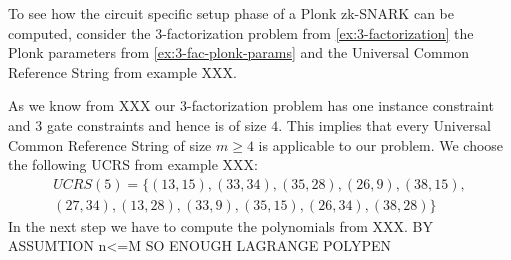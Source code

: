 \begin{example}
\label{ex:3-fac-CSCRS}
To see how the circuit specific setup phase of a Plonk zk-SNARK can be computed, consider the $3$-factorization problem from \ref{ex:3-factorization} the Plonk parameters from \examplename{} \ref{ex:3-fac-plonk-params} and the Universal Common Reference String from example XXX. 

As we know from XXX our $3$-factorization problem has one instance constraint and $3$ gate constraints and hence is of size $4$. This implies that every Universal Common Reference String of size $m\geq 4$ is applicable to our problem. We choose the following UCRS from example XXX:
\begin{multline*}
UCRS(5) =\{(13,15), (33,34), (35,28), (26,9), (38,15), \\
(27,34), (13,28), (33,9), (35,15), (26,34), (38,28)\}
\end{multline*}
In the next step we have to compute the polynomials from XXX. BY ASSUMTION n<=M SO ENOUGH LAGRANGE POLYPEN


\end{example}
